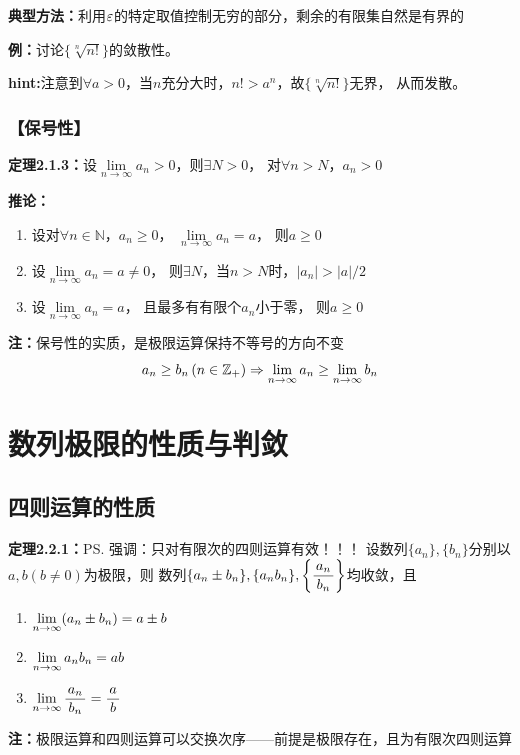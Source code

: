 {\bf 典型方法：}利用$\varepsilon$的特定取值控制无穷的部分，剩余的有限集自然是有界的

{\bf 例：}讨论$\{\sqrt[n]{n!}\}$的敛散性。

{\bf hint:}注意到$\forall a>0$，当$n$充分大时，$n!>a^n$，故$\{\sqrt[n]{n!}\}$无界，
从而发散。

\subsubsection{【保号性】}

{\bf 定理2.1.3：}设$\lim\limits_{n\to\infty}a_n>0$，则$\exists N>0$，
		对$\forall n>N$，$a_n>0$
		
{{\bf 推论：}} 
\begin{enumerate}
  \setlength{\itemindent}{1cm}
  \item 设对$\forall n\in\mathbb{N}$，$a_n\geq
  0$， $\lim\limits_{n\to\infty}a_n=a$， 则$a\geq 0$ 
  \item 设$\lim\limits_{n\to\infty}a_n=a\ne
  0$， 则$\exists N$，当$n>N$时，$|a_n|>|a|/2$ 
  \item
  设$\lim\limits_{n\to\infty}a_n=a$， 且最多有有限个$a_n$小于零， 则$a\geq 0$
\end{enumerate}	

{\bf 注：}保号性的实质，是极限运算保持不等号的方向不变
$$a_n\geq b_n\,(n\in\mathbb{Z}_+)\Rightarrow\lim\limits_{n\to\infty} a_n\geq\lim\limits_{n\to\infty} b_n$$

\section{数列极限的性质与判敛}

\subsection{四则运算的性质}

{\bf 定理2.2.1：}\ps{强调：只对有限次的四则运算有效！！！}
设数列$\{a_n\},\{b_n\}$分别以$a,b(b\neq 0)$为极限，则
数列$\{a_n\pm b_n\},\{a_nb_n\},\left\{\displaystyle\frac{\,{a_n}\,}{\,{b_n}\,}\right\}$均收敛，且
\begin{enumerate}
  \setlength{\itemindent}{1cm}
  \item $\lim\limits_{n\to\infty}(a_n\pm b_n)=a\pm b$
  \item $\lim\limits_{n\to\infty} a_nb_n=ab$
  \item $\lim\limits_{n\to\infty}\displaystyle\frac{\,{a_n}\,}{\,{b_n}\,}=\displaystyle\frac{\,{a}\,}{\,{b}\,}$
\end{enumerate}

{\bf 注：}极限运算和四则运算可以交换次序——前提是极限存在，且为有限次四则运算

